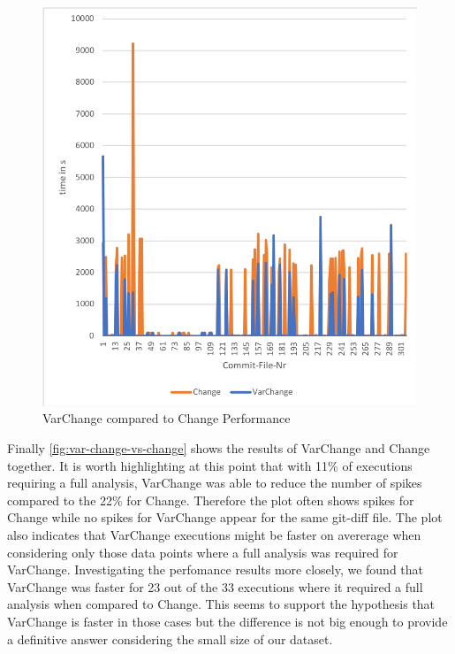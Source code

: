 \documentclass[a4paper]{article}
\begin{document}
\begin{figure}[h] 
  \centering
  \begin{minipage}[b]{1\textwidth} 
    \caption[VarChange compared to Change Performance]{VarChange compared to Change Performance}\label{fig:var-change-vs-change}
    \includegraphics[width=1\textwidth]{img/var-change-vs-change.png}
  \end{minipage}
\end{figure}

Finally \autoref{fig:var-change-vs-change} shows the results of VarChange and Change together. It is worth highlighting at this point that with 11\% of executions requiring a full analysis, VarChange was able to reduce the number of spikes compared to the 22\% for Change. Therefore the plot often shows spikes for Change while no spikes for VarChange appear for the same git-diff file.
The plot also indicates that VarChange executions might be faster on avererage when considering only those data points where a full analysis was required for VarChange. Investigating the perfomance results more closely, we found that VarChange was faster for 23 out of the 33 executions where it required a full analysis when compared to Change. This seems to support the hypothesis that VarChange is faster in those cases but the difference is not big enough to provide a definitive answer considering the small size of our dataset.
 
\end{document}
